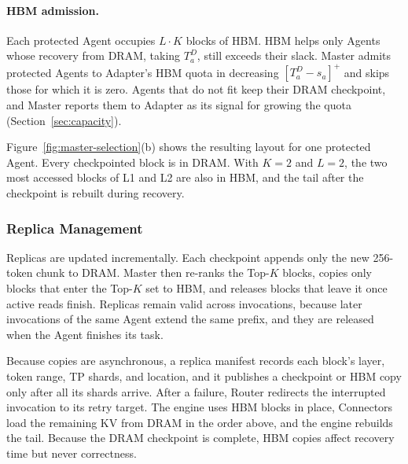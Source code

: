 \paragraph{HBM admission.}
Each protected Agent occupies $L\cdot K$ blocks of HBM. HBM helps only
Agents whose recovery from DRAM, taking $T^{D}_a$, still exceeds their
slack. Master admits protected Agents to Adapter's HBM quota in
decreasing $[T^{D}_a-s_a]^+$ and skips those for which it is zero. Agents
that do not fit keep their DRAM checkpoint, and Master reports them to
Adapter as its signal for growing the quota (Section~\ref{sec:capacity}).

Figure~\ref{fig:master-selection}(b) shows the resulting layout for one
protected Agent. Every checkpointed block is in DRAM. With $K=2$ and
$L=2$, the two most accessed blocks of L1 and L2 are also in HBM, and the
tail after the checkpoint is rebuilt during recovery.

\subsubsection{Replica Management}
\label{sec:master-online}
\label{sec:execution}

Replicas are updated incrementally. Each checkpoint appends only the new
256-token chunk to DRAM. Master then re-ranks the Top-$K$ blocks, copies
only blocks that enter the Top-$K$ set to HBM, and releases blocks that
leave it once active reads finish. Replicas remain valid across
invocations, because later invocations of the same Agent extend the same
prefix, and they are released when the Agent finishes its task.

Because copies are asynchronous, a replica manifest records each block's
layer, token range, TP shards, and location, and it publishes a checkpoint
or HBM copy only after all its shards arrive. After a failure, Router
redirects the interrupted invocation to its retry target. The engine uses
HBM blocks in place, Connectors load the remaining KV from DRAM in the
order above, and the engine rebuilds the tail. Because the DRAM checkpoint
is complete, HBM copies affect recovery time but never correctness.

